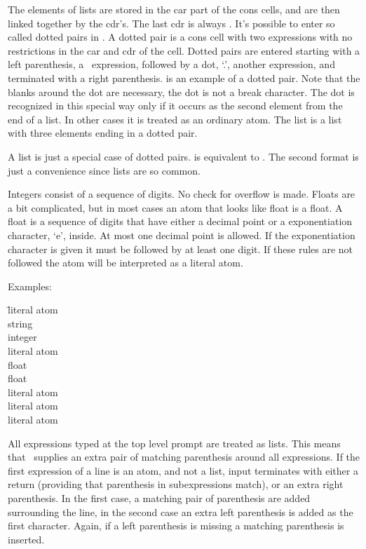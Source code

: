 The elements of lists are stored in the car part of the cons cells,
and are then linked together by the cdr's.  The last cdr is always
\NIL.  It's possible to enter so called dotted pairs in \lips.  A
dotted pair is a cons cell with two expressions with no restrictions
in the car and cdr of the cell.  Dotted pairs are entered starting
with a left parenthesis, a \lips\ expression, followed by a dot, `.',
another expression, and terminated with a right parenthesis.
 is an example of a dotted pair. Note that the blanks
around the dot are necessary, the dot is not a break character.  The
dot is recognized in this special way only if it occurs as the second
element from the end of a list.  In other cases it is treated as an
ordinary atom.  The list  is a list with three
elements ending in a dotted pair.

A list is just a special case of dotted pairs.   is equivalent to .  The second format is just
a convenience since lists are so common.

Integers consist of a sequence of digits.  No check for overflow is
made.  Floats are a bit complicated, but in most cases an atom that
looks like float is a float.  A float is a sequence of digits that
have either a decimal point or a exponentiation character, `e',
inside.  At most one decimal point is allowed.  If the exponentiation
character is given it must be followed by at least one digit.  If
these rules are not followed the atom will be interpreted as a literal
atom.

Examples:
\begin{tabbing}
\hspace*{1cm}\=literal atom\\
      \>string\\
        \>integer\\
        \>literal atom\\
        \>float\\
        \>float\\
         \>literal atom\\
        \>literal atom\\
       \>literal atom
\end{tabbing}

All expressions typed at the top level prompt are treated as lists.
This means that \lips\ supplies an extra pair of matching parenthesis
around all expressions.  If the first expression of a line is an atom,
and not a list, input terminates with either a return (providing that
parenthesis in subexpressions match), or an extra right parenthesis.
In the first case, a matching pair of parenthesis are added
surrounding the line, in the second case an extra left parenthesis is
added as the first character.  Again, if a left parenthesis is missing
a matching parenthesis is inserted.

